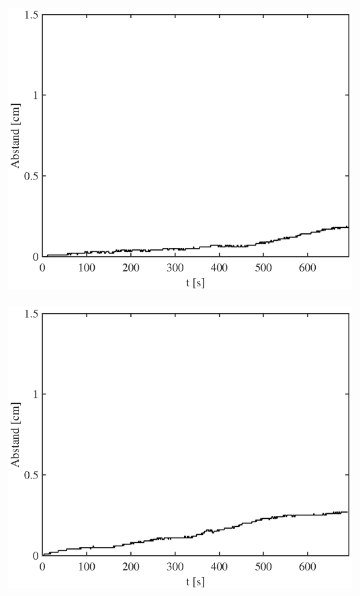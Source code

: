 \documentclass[doc,a4paper,12pt]{apa6}
\begin{document}
\begin{figure}
  \captionsetup{justification=centering}
  \begin{subfigure}[c]{0.23\textwidth}
    \includegraphics[width=\textwidth]{ergebnisse/pa07/pa07a1_mc_dist_movement.eps}
    \label{img:bewegung:pa07:1}
  \end{subfigure}\hspace*{0.02\textwidth}
  \begin{subfigure}[c]{0.23\textwidth}
    \includegraphics[width=\textwidth]{ergebnisse/pa07/pa07a3_mc_dist_movement.eps}

\end{subfigure}
\end{figure}
\end{document}
